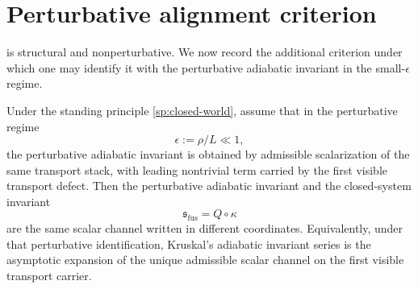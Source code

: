 \section{Perturbative alignment criterion}
\label{sec:fusion-asymptotic}
 is structural and nonperturbative.
We now record the additional criterion under which one may identify it
with the perturbative adiabatic invariant in the small-\(\epsilon\)
regime.
\begin{theorem}
	\label{thm:fusion-equivalence}
	Under the standing principle \cref{sp:closed-world}, assume that in the
	perturbative regime
	\[
		\epsilon:=\rho/L\ll 1,
	\]
	the perturbative adiabatic invariant is obtained by admissible
	scalarization of the same transport stack, with leading nontrivial term
	carried by the first visible transport defect.
	Then the perturbative adiabatic invariant and the closed-system invariant
	\[
		\mathfrak s_{\mathrm{fus}}=Q\circ\kappa
	\]
	are the same scalar channel written in different coordinates.
	Equivalently, under that perturbative identification, Kruskal's
	adiabatic invariant series is the asymptotic expansion of the unique
	admissible scalar channel on the first visible transport carrier.
\end{theorem}
